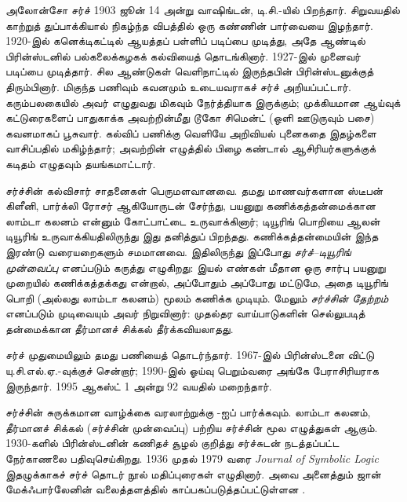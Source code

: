 \documentclass[../../../include/open-logic-section]{subfiles}
\begin{document}



அலோன்சோ சர்ச் 1903 ஜூன் 14 அன்று வாஷிங்டன், டி.சி.-யில் பிறந்தார்.
சிறுவயதில் காற்றுத் துப்பாக்கியால் நிகழ்ந்த விபத்தில் ஒரு கண்ணின் பார்வையை
இழந்தார். 1920-இல் கனெக்டிகட்டில் ஆயத்தப் பள்ளிப் படிப்பை முடித்து,
அதே ஆண்டில் பிரின்ஸ்டனில் பல்கலைக்கழகக் கல்வியைத் தொடங்கினார். 1927-இல்
முனைவர் படிப்பை முடித்தார். சில ஆண்டுகள் வெளிநாட்டில் இருந்தபின்
பிரின்ஸ்டனுக்குத் திரும்பினார். மிகுந்த பணிவும் கவனமும் உடையவராகச் சர்ச்
அறியப்பட்டார். கரும்பலகையில் அவர் எழுதுவது மிகவும் நேர்த்தியாக இருக்கும்;
முக்கியமான ஆய்வுக் கட்டுரைகளைப் பாதுகாக்க அவற்றின்மீது டூகோ சிமென்ட்
(ஒளி ஊடுருவும் பசை) கவனமாகப் பூசுவார். கல்விப் பணிக்கு வெளியே
அறிவியல் புனைகதை இதழ்களை வாசிப்பதில் மகிழ்ந்தார்; அவற்றின் எழுத்தில்
பிழை கண்டால் ஆசிரியர்களுக்குக் கடிதம் எழுதவும் தயங்கமாட்டார்.

சர்ச்சின் கல்விசார் சாதனைகள் பெருமளவானவை. தமது மாணவர்களான ஸ்டீபன் கிளீனி,
பார்க்லி ரோசர் ஆகியோருடன் சேர்ந்து, பயனுறு கணிக்கத்தன்மைக்கான லாம்டா
கலனம் என்னும் கோட்பாட்டை உருவாக்கினார்; டியூரிங் பொறியை ஆலன் டியூரிங்
உருவாக்கியதிலிருந்து இது தனித்துப் பிறந்தது. கணிக்கத்தன்மையின் இந்த இரண்டு
வரையறைகளும் சமமானவை. இதிலிருந்து இப்போது \emph{சர்ச்--டியூரிங் முன்வைப்பு}
எனப்படும் கருத்து எழுகிறது: இயல் எண்கள் மீதான ஒரு சார்பு பயனுறு முறையில்
கணிக்கத்தக்கது என்றால், அப்போதும் அப்போது மட்டுமே, அதை டியூரிங் பொறி
(அல்லது லாம்டா கலனம்) மூலம் கணிக்க முடியும். மேலும் \emph{சர்ச்சின் தேற்றம்}
எனப்படும் முடிவையும் அவர் நிறுவினார்: முதல்தர வாய்பாடுகளின் செல்லுபடித்
தன்மைக்கான தீர்மானச் சிக்கல் தீர்க்கவியலாதது.

சர்ச் முதுமையிலும் தமது பணியைத் தொடர்ந்தார். 1967-இல் பிரின்ஸ்டனை விட்டு
யு.சி.எல்.ஏ.-வுக்குச் சென்றார்; 1990-இல் ஓய்வு பெறும்வரை அங்கே
பேராசிரியராக இருந்தார். 1995 ஆகஸ்ட் 1 அன்று 92 வயதில் மறைந்தார்.

\begin{reading}
சர்ச்சின் சுருக்கமான வாழ்க்கை வரலாற்றுக்கு \citet{EndertonND}-ஐப் பார்க்கவும்.
லாம்டா கலனம், தீர்மானச் சிக்கல் (சர்ச்சின் முன்வைப்பு) பற்றிய சர்ச்சின்
மூல எழுத்துகள் \citet{Church1936,Church1936a} ஆகும். 1930-களில்
பிரின்ஸ்டனின் கணிதச் சூழல் குறித்து சர்ச்சுடன் நடத்தப்பட்ட நேர்காணலை
\citet{Aspray1984} பதிவுசெய்கிறது. 1936 முதல் 1979 வரை
\emph{Journal of Symbolic Logic} இதழுக்காகச் சர்ச் தொடர் நூல் மதிப்புரைகள்
எழுதினார். அவை அனைத்தும் ஜான் மேக்ஃபார்லேனின் வலைத்தளத்தில்
காப்பகப்படுத்தப்பட்டுள்ளன \citep{MacFarlane2015}.
\end{reading}
\end{document}
